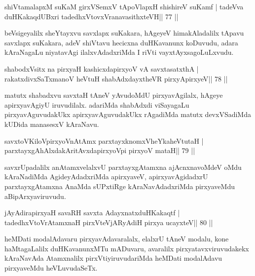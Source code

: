 
\begin{shl}
shiVtamalapxM suKaM girxVSemxV tApoV\s lapxH shishireV suKamf |
tadeVva duHKakaqdUBxri tadedhxVtovxVranavasithxteVH\hfill || 77 ||
\end{shl}

\begin{artha}
 beVsigeyalilx sheYtayxvu savxlapx suKakara, hAgeyeV himakAladalilx
 tApavu savxlapx suKakara, adeV shiVtavu hecicxna duHKavanunx
 koDuvudu, adara kAraNagaLu niyatavAgi ilalxvAdadxriMda I
 riVti vayxtAyxsagoLuLxvudu.
\end{artha}

\begin{shl}
shabodxV\s sitx na pirxyaH kashicxdapirxyoV vA savxtasatxthA |
rakatxdivxSaTxmanoV heVtuH shabAdxdayxtheVR pirxyApirxyeV\hfill || 78 ||
\end{shl}

\begin{artha}
matutx shabadxvu savxtaH tAneV yAvudoMdU pirxyavAgilalx, hAgeye apirxyavAgiyU iruvudilalx. adariMda shabAdxdi viSayagaLu pirxyavAguvudakUkx apirxyavAguvudakUkx rAgadiMda matutx devxVSadiMda kUDida manasesxV kAraNavu.
\end{artha}


\begin{shl}
savxtoV\s KiloV\s pirxyoV\s nAtAmx parxtayxknomxVheYkaheVtutaH |
parxtayxgAhAlxdakAritAvxdapirxyoV\s pi pirxyoV mataH\hfill || 79 ||
\end{shl}

\begin{artha}
savxrUpadalilx anAtamxvelalxvU parxtayxgAtamxna ajAcnxnavoMdeV oMdu kAraNadiMda AgideyAdadxriMda apirxyaveV, apirxyavAgidadxrU parxtayxgAtamxna AnaMda sUPxtiRge kAraNavAdadxriMda pirxyaveMdu aBipArxyaviruvudu.
\end{artha}

\begin{shl}
jAyAdirapirxyaH savaRH savxta AdayxnatxduHKakaqtf |
tadedhxVtoVrAtamxnaH pirxVteVjARyAdiH pirxya ucayxteV\hfill || 80 ||
\end{shl}

\begin{artha}
heMDati modalAdavaru pirxyavAdavaralalx, elalxrU tAneV modalu, kone haMtagaLalilx duHKavanunxMTu mADuvaru, avaralilx pirxyatavxviruvudakekx kAraNavAda Atamxnalilx pirxVtiyiruvudariMda heMDati modalAdavu pirxyaveMdu heVLuvudaSeTx.
\end{artha}

